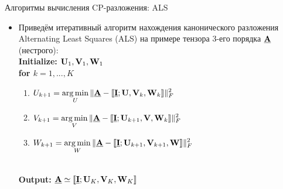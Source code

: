     
% 
\begin{frame}{Алгоритмы вычисления CP-разложения: ALS}

\begin{itemize}

    \item Приведём итеративный алгоритм нахождения канонического разложения Alternating Least Squares (ALS) на примере тензора 3-его порядка $\underline{\textbf{A}}$ (нестрого):
    \vspace{0.5cm}
    \\
    \textbf{Initialize: $\textbf{U}_1, \textbf{V}_1, \textbf{W}_1$} \\
    \textbf{for $k = 1, ..., K$}
    \begin{enumerate}
    \item $\displaystyle U_{k+1} = \operatorname*{arg\,min}_{U}{\lVert \underline{\textbf{A}} - \llbracket \underline{\textbf{I}} ; \textbf{U}, \textbf{V}_k,  \textbf{W}_k \rrbracket \rVert_F^2}$
    \item $\displaystyle V_{k+1} = \operatorname*{arg\,min}_{V}{\lVert \underline{\textbf{A}} - \llbracket \underline{\textbf{I}} ; \textbf{U}_{k+1}, \textbf{V},  \textbf{W}_k \rrbracket \rVert_F^2}$
    \item $\displaystyle W_{k+1} = \operatorname*{arg\,min}_{W}{\lVert \underline{\textbf{A}} - \llbracket \underline{\textbf{I}} ; \textbf{U}_{k+1}, \textbf{V}_{k+1},  \textbf{W} \rrbracket \rVert_F^2}$
    
    \end{enumerate} \\
    \textbf{Output: $\underline{\textbf{A}} \simeq \llbracket \underline{\textbf{I}} ; \textbf{U}_K, \textbf{V}_K, \textbf{W}_K \rrbracket$}  \\

\end{itemize}
\end{frame}

